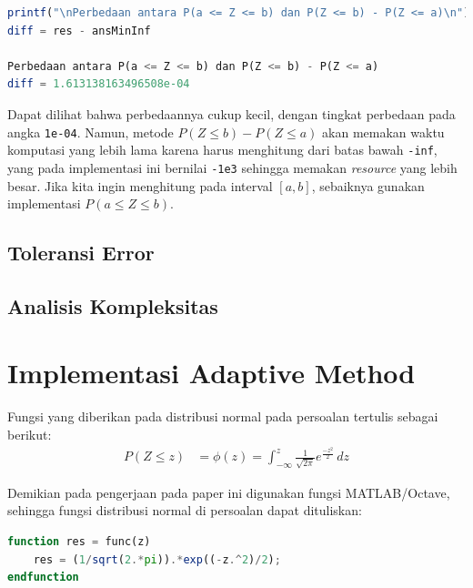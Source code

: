 \documentclass[journal,12pt,onecolumn,a4paper]{IEEEtran}
\begin{document}
\begin{center}
	\begin{lstlisting}[language=Octave]
printf("\nPerbedaan antara P(a <= Z <= b) dan P(Z <= b) - P(Z <= a)\n")
diff = res - ansMinInf

Perbedaan antara P(a <= Z <= b) dan P(Z <= b) - P(Z <= a)
diff = 1.613138163496508e-04
	\end{lstlisting}
\end{center}

Dapat dilihat bahwa perbedaannya cukup kecil, dengan tingkat perbedaan pada angka \lstinline{1e-04}. Namun, metode \(P(Z \le b ) - P(Z \le a )\) akan memakan waktu komputasi yang lebih lama karena harus menghitung dari batas bawah \lstinline{-inf}, yang pada implementasi ini bernilai \lstinline{-1e3} sehingga memakan \emph{resource} yang lebih besar. Jika kita ingin menghitung pada interval \([a,b]\), sebaiknya gunakan implementasi \(P(a \le Z \le b)\).

\subsection{Toleransi Error}

\subsection{Analisis Kompleksitas}

\section{Implementasi Adaptive Method}
\par Fungsi yang diberikan pada distribusi normal pada persoalan tertulis sebagai berikut:
\begin{equation*}
	\begin{split}
		P(Z \le z ) & = \phi(z) = \int_{-\infty}^{z} \frac{1}{\sqrt{2\pi}}e ^{\frac{-z^2}{2}} \,dz
	\end{split}
\end{equation*}

\par Demikian pada pengerjaan pada paper ini digunakan fungsi MATLAB/Octave, sehingga fungsi distribusi normal di persoalan dapat dituliskan:
\begin{center}
	\begin{lstlisting}[language=Octave]
function res = func(z)
	res = (1/sqrt(2.*pi)).*exp((-z.^2)/2);
endfunction
	\end{lstlisting}
\end{center}
\end{document}
